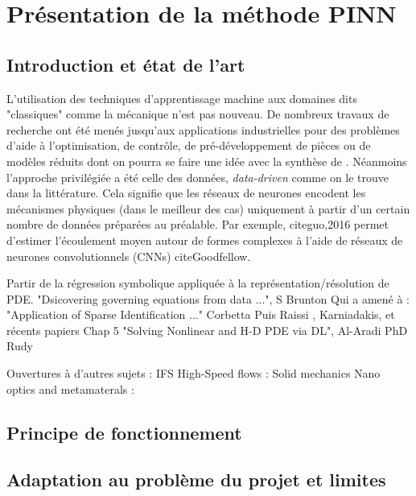 \section{Présentation de la méthode PINN}

\subsection{Introduction et état de l'art}

L'utilisation des techniques d'apprentissage machine aux domaines dits "classiques" comme la mécanique n'est pas nouveau. De nombreux travaux de recherche ont été menés jusqu'aux applications industrielles pour des problèmes d'aide à l'optimisation, de contrôle, de pré-développement de pièces ou de modèles réduits dont on pourra se faire une idée avec la synthèse de \cite{brunton_machine_2019}. Néanmoins l'approche privilégiée a été celle des données, \textit{data-driven} comme on le trouve dans la littérature. Cela signifie que les réseaux de neurones encodent les mécanismes physiques (dans le meilleur des cas) uniquement à partir d'un certain nombre de données préparées au préalable. Par exemple, cite{guo,2016} permet d'estimer l'écoulement moyen autour de formes complexes à l'aide de réseaux de neurones convolutionnels (CNNs) cite{Goodfellow}. 

Partir de la régression symbolique appliquée à la représentation/résolution de PDE.
"Dsicovering governing equations from data ...", S Brunton \cite{bruntonDiscoveringGoverningEquations2016}
Qui a amené à :
"Application of Sparse Identification ..." Corbetta \cite{corbettaApplicationSparseIdentification}
Puis Raissi \cite{raissiPhysicsinformedNeuralNetworks2019,raissiHiddenFluidMechanics2018}, Karniadakis, et récents papiers
Chap 5 "Solving Nonlinear and H-D PDE via DL", Al-Aradi \cite{al-aradiSolvingNonlinearHighDimensional}
PhD Rudy \cite{rudyComputationalMethodsSystem2019}


Ouvertures à d'autres sujets :
IFS \cite{raissiDeepLearningVortexinduced2019a}
High-Speed flows : \cite{maoPhysicsinformedNeuralNetworks2020}
Solid mechanics \cite{haghighatDeepLearningFramework2020,luExtractionMechanicalProperties2020}
Nano optics and metamaterals : \cite{chenPhysicsinformedNeuralNetworks2020}


\subsection{Principe de fonctionnement}

\subsection{Adaptation au problème du projet et limites}

